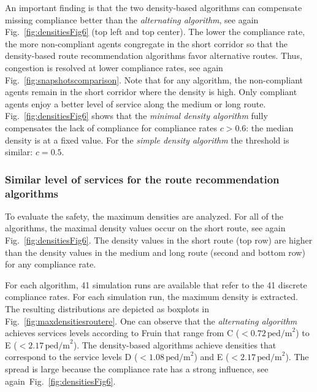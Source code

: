 An important finding is that the two density-based algorithms can compensate missing compliance better than the \textit{alternating algorithm}, see again Fig.~\ref{fig:densitiesFig6} (top left and top center). 
The lower the compliance rate, the more non-compliant agents congregate in the short corridor
so that the density-based route recommendation algorithms favor alternative routes. Thus, congestion is resolved at lower compliance rates, see again Fig.~\ref{fig:snapshotscomparison}. Note that for any algorithm, the non-compliant agents remain in the short corridor where the density is high. Only compliant agents enjoy a better level of service along the medium or long route.
Fig.~\ref{fig:densitiesFig6} shows that the \textit{minimal density algorithm} fully compensates the lack of compliance for compliance rates $c>0.6$: the median density is at a fixed value. For the \textit{simple density algorithm} the threshold is similar: $c=0.5$.









\subsubsection{Similar level of services for the route recommendation algorithms}


To evaluate the safety, the maximum densities are analyzed. For all of the algorithms, the maximal density values occur on the short route, see again Fig.~\ref{fig:densitiesFig6}. The density values in the short route (top row) are higher than the density values in the medium and long route (second and bottom row) for any compliance rate.

For each algorithm, 41 simulation runs are available that refer to the 41 discrete compliance rates. For each simulation run, the maximum density is extracted. The resulting distributions are depicted as boxplots in Fig.~\ref{fig:maxdensitiesroutere}. One can observe that the \textit{alternating algorithm} achieves services levels according to Fruin that range from C ($<0.72\,\text{ped/m}^2$) to E ($<2.17\,\text{ped/m}^2$). The density-based algorithms achieve densities that correspond to the service levels D ($<1.08\,\text{ped/m}^2$) and E ($<2.17\,\text{ped/m}^2$).
The spread is large because the compliance rate has a strong influence, see again~Fig.~\ref{fig:densitiesFig6}.




